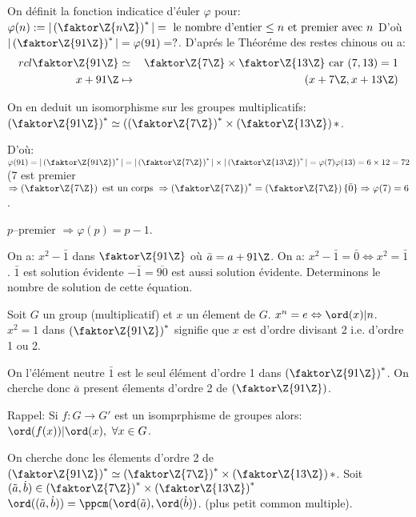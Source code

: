 On définit la fonction indicatice d'éuler $\varphi $ pour: $\varphi (n):=|\left(\faktor\Z{n\Z}\right)^\ast|=\mbox{ le nombre d'entier $\leq n$ et premier avec $n$}$ D'où $|\left(\faktor\Z{91\Z}\right)^\ast|=\varphi (91)=?$. D'aprés le Théoréme des restes chinous ou a:
\begin{align}{rcl}
	\faktor\Z{91\Z} &\simeq& \faktor\Z{7\Z}\times \faktor\Z{13\Z}\text{ car } (7,13)=1\\
	x+91\Z &\mapsto& (x+7\Z,x+13\Z)
\end{align}

On en deduit un isomorphisme sur les groupes multiplicatifs: $\left(\faktor\Z{91\Z}\right)^\ast\simeq(\left(\faktor\Z{7\Z}\right)^\ast\times \left(\faktor\Z{13\Z}\right)
\ast$. 

D'où: $\varphi (91)=|\left(\faktor\Z{91\Z}\right)^\ast |=|\left(\faktor\Z{7\Z}\right)^\ast|\times|\left(\faktor\Z{13\Z}\right)^\ast|= \varphi (7)\varphi (13)=6\times 12=72$
(7 est premier $\Rightarrow \left(\faktor\Z{7\Z}\right) \text{ est un corps } \Rightarrow \left(\faktor\Z{7\Z}\right)^\ast=\left(\faktor\Z{7\Z}\right)\\ \{\bar 0\} \Rightarrow \varphi (7)=6$.

$p$--premier $\Rightarrow \varphi (p)=p-1$.

On a: $x^2-\bar 1$ dans $\faktor\Z{91\Z}$ où $\bar a=a+91\Z$. On a: $x^2-\bar 1 =\bar 0 \Leftrightarrow x^2=\bar 1$. $\bar 1$ est solution évidente $-\bar 1=\overline{90}$ est aussi solution évidente. Determinons le nombre de solution de cette équation.

\begin{remark}
	Soit $G$ un group (multiplicatif) et $x$ un élement de $G$. $x^n=e\Leftrightarrow \ord(x)|n$. $x^2=1$ dans $\left(\faktor\Z{91\Z}\right)^\ast$ signifie que $x$ est d'ordre divisant 2 i.e. d'ordre 1 ou 2.
	
	On l'élément neutre $\bar 1$ est le seul élément d'ordre 1 dans $\left(\faktor\Z{91\Z}\right)^\ast$. On cherche donc $\bar a$ present élements d'ordre 2 de $\left(\faktor\Z{91\Z}\right)$. 
\end{remark}

Rappel: Si $f:G\rightarrow G'$ est un isomprphisme de groupes alors: $\ord(f(x))|\ord(x),\ \forall x\in G$.

On cherche donc les élements d'ordre 2 de $\left(\faktor\Z{91\Z}\right)^\ast\simeq \left(\faktor\Z{7\Z}\right)^\ast\times \left(\faktor\Z{13\Z}\right)
\ast$. Soit $(\tilde a, \dot b)\in \left( \faktor\Z{7\Z} \right)^\ast \times \left( \faktor\Z{13\Z} \right)^\ast$ $\ord((\tilde a,\dot b))=\ppcm(\ord(\tilde a),\ord(\dot b))$. (plus petit common multiple).

